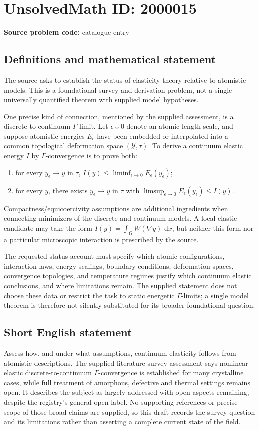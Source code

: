 \documentclass[11pt]{article}
\newcommand{\dd}{\,\mathrm{d}}
\begin{document}
\section*{UnsolvedMath ID: 2000015}
\textbf{Source problem code:} catalogue entry
\subsection{Definitions and mathematical statement}
The source asks to establish the status of elasticity theory relative to atomistic models. This is a foundational survey and derivation problem, not a single universally quantified theorem with supplied model hypotheses.

One precise kind of connection, mentioned by the supplied assessment, is a discrete-to-continuum $\Gamma$-limit. Let $\epsilon\downarrow0$ denote an atomic length scale, and suppose atomistic energies $E_\epsilon$ have been embedded or interpolated into a common topological deformation space $(\mathcal Y,\tau)$. To derive a continuum elastic energy $I$ by $\Gamma$-convergence is to prove both:
\begin{enumerate}
\item for every $y_\epsilon\to y$ in $\tau$, $I(y)\leq\liminf_{\epsilon\to0}E_\epsilon(y_\epsilon)$;
\item for every $y$, there exists $y_\epsilon\to y$ in $\tau$ with $\limsup_{\epsilon\to0}E_\epsilon(y_\epsilon)\leq I(y)$.
\end{enumerate}
Compactness/equicoercivity assumptions are additional ingredients when connecting minimizers of the discrete and continuum models. A local elastic candidate may take the form $I(y)=\int_\Omega W(\nabla y)\,\dd x$, but neither this form nor a particular microscopic interaction is prescribed by the source.

The requested status account must specify which atomic configurations, interaction laws, energy scalings, boundary conditions, deformation spaces, convergence topologies, and temperature regimes justify which continuum elastic conclusions, and where limitations remain. The supplied statement does not choose these data or restrict the task to static energetic $\Gamma$-limits; a single model theorem is therefore not silently substituted for its broader foundational question.
\subsection{Short English statement}
Assess how, and under what assumptions, continuum elasticity follows from atomistic descriptions. The supplied literature-survey assessment says nonlinear elastic discrete-to-continuum $\Gamma$-convergence is established for many crystalline cases, while full treatment of amorphous, defective and thermal settings remains open. It describes the subject as largely addressed with open aspects remaining, despite the registry's general open label. No supporting references or precise scope of those broad claims are supplied, so this draft records the survey question and its limitations rather than asserting a complete current state of the field.
\end{document}
